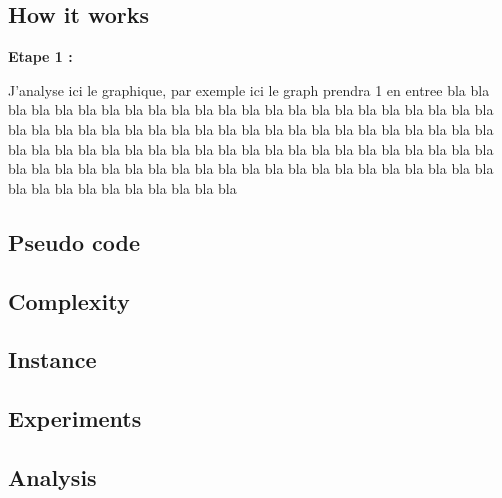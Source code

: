 
\subsection{How it works}

\hspace*{1cm} \textbf{Etape 1 :}
\\
\begin{minipage}{0.5\textwidth}
\end{minipage}
\begin{minipage}{0.5\textwidth}
    J'analyse ici le graphique, par exemple ici le graph prendra 1 en entree bla bla bla bla bla bla bla bla bla bla bla bla bla bla bla bla bla bla bla bla bla bla bla bla bla bla bla bla bla bla bla bla bla bla bla bla bla bla bla bla bla bla bla bla bla bla bla bla bla bla bla bla bla bla bla bla bla bla bla bla bla bla bla bla bla bla bla bla bla bla bla bla bla bla bla bla bla bla bla bla bla bla bla bla bla bla bla bla bla bla bla bla bla bla bla bla
\end{minipage}


\subsection{Pseudo code}


\subsection{Complexity}


\subsection{Instance}


\subsection{Experiments}


\subsection{Analysis}

\newpage